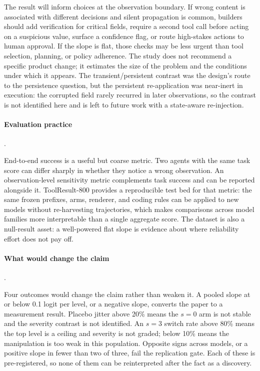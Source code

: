 \documentclass[a4paper,fleqn]{cas-sc}
\begin{document}
The result will inform choices at the observation boundary. If wrong content is associated with different decisions and
silent propagation is common, builders should add verification for critical fields, require a
second tool call before acting on a suspicious value, surface a confidence flag, or route
high-stakes actions to human approval. If the slope is flat, those checks may be less urgent than
tool selection, planning, or policy adherence. The study does not recommend a specific product
change; it estimates the size of the problem and the conditions under which it appears. The
transient/persistent contrast was the design's route to the persistence question, but the
persistent re-application was near-inert in execution: the corrupted field rarely recurred in
later observations, so the contrast is not identified here and is left to future work with a
state-aware re-injection.

\paragraph{Evaluation practice}.\

End-to-end success is a useful but coarse metric. Two agents with the same task score can differ
sharply in whether they notice a wrong observation. An observation-level sensitivity metric
complements task success and can be reported alongside it. ToolResult-800 provides a reproducible
test bed for that metric: the same frozen prefixes, arms, renderer, and coding rules can be
applied to new models without re-harvesting trajectories, which makes comparisons across model
families more interpretable than a single aggregate score. The dataset is also a null-result
asset: a well-powered flat slope is evidence about where reliability effort does not pay off.

\paragraph{What would change the claim}.\

Four outcomes would change the claim rather than weaken it. A pooled slope at or below 0.1 logit
per level, or a negative slope, converts the paper to a measurement result. Placebo jitter above
20\% means the $s=0$ arm is not stable and the severity contrast is not identified. An $s=3$
switch rate above 80\% means the top level is a ceiling and severity is not graded; below 10\%
means the manipulation is too weak in this population. Opposite signs across models, or a
positive slope in fewer than two of three, fail the replication gate. Each of these is
pre-registered, so none of them can be reinterpreted after the fact as a discovery.
\end{document}

